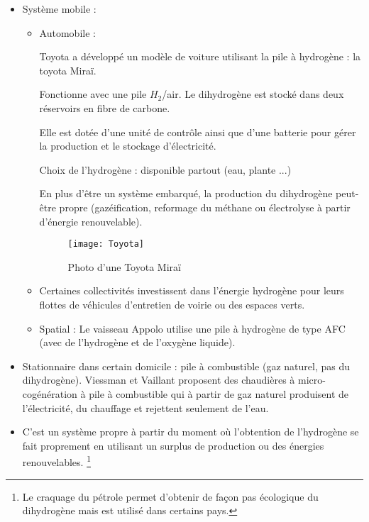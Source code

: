 \documentclass[a4paper, 11pt, twoside]{article}
\numberwithin{equation}{subsection}
\newcommand{\couleur}[1]{\ifbool{Couleur}{\color{#1}}{}}
\newcounter{th}\newcommand{\Thm}[2][]{\couleur{brown}\vspace{3ex}\boxput*(-0.4,1){\setlength{\fboxsep}{0pt}\colorbox{white}{\setlength{\fboxsep}{1ex}\Ovalbox{{\textsc{\ifstrequal{#1}{}{Théorème \stepcounter{th} \theth \phantom{}}{Théorème \stepcounter{th} \theth \phantom{} : #1}}}}}}{\setlength{\fboxsep}{7mm}\doublebox{\noindent \begin{minipage}{0.95\linewidth}\vspace{1ex}#2\end{minipage}}}\vspace{1ex}\couleur{black}}
\begin{document}
	\begin{itemize}
		\item Système mobile :
			\begin{itemize}
				\item Automobile :
				
				Toyota a développé un modèle de voiture utilisant la pile à hydrogène : la toyota Miraï. \cite{Toyota}
				
				Fonctionne avec une pile $H_2$/air. Le dihydrogène est stocké dans deux réservoirs en fibre de carbone.
				
				Elle est dotée d'une unité de contrôle ainsi que d'une batterie pour gérer la production et le stockage d'électricité.
				
				Choix de l'hydrogène : disponible partout (eau, plante ...)
				
				En plus d'être un système embarqué, la production du dihydrogène peut-être propre (gazéification, reformage du méthane ou électrolyse à partir d'énergie renouvelable).
				
				\begin{figure}[!h]
					\begin{center}
						\texttt{[image: Toyota]}
						\caption{Photo d'une Toyota Miraï}
					\end{center}
				\end{figure}
			
			\item Certaines collectivités investissent dans l'énergie hydrogène pour leurs flottes de véhicules d'entretien de voirie ou des espaces verts.
			\item Spatial \cite{Spatial}:
				Le vaisseau Appolo utilise une pile à hydrogène de type AFC (avec de l'hydrogène et de l'oxygène liquide).
			
		\end{itemize}
		
		\item Stationnaire dans certain domicile : pile à combustible (gaz naturel, pas du dihydrogène). Viessman et Vaillant proposent des chaudières à micro-cogénération à pile à combustible qui à partir de gaz naturel produisent de l'électricité, du chauffage et rejettent seulement de l'eau.
		
		\item C'est un système propre à partir du moment où l'obtention de l'hydrogène se fait proprement en utilisant un surplus de production ou des énergies renouvelables. \footnote{Le craquage du pétrole permet d'obtenir de façon pas écologique du dihydrogène mais est utilisé dans certains pays.}
	\end{itemize}
	
\end{document}
